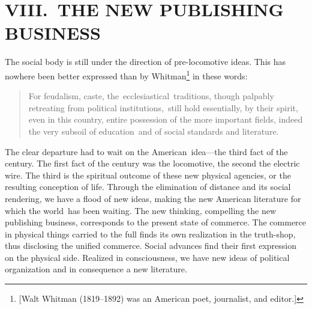 \documentclass[twoside,symmetric,nobib,justified]{tufte-book}
\begin{document}
\hypertarget{viii-the-new-publishing-business}{%
\section{VIII.~THE NEW PUBLISHING
BUSINESS~}\label{viii-the-new-publishing-business}}

The social body is still under the direction of pre-locomotive ideas.
This has nowhere been better expressed than by Whitman\footnote{{[}Walt
  Whitman (1819--1892) was an American poet, journalist, and editor.{]}}
in these words:

\begin{quote}
For feudalism, caste, the~ecclesiastical~traditions, though palpably
retreating from political institutions,~still hold essentially, by their
spirit, even in this country, entire possession of the more important
fields, indeed the very subsoil of education~and of social standards and
literature.
\end{quote}

\noindent The clear departure had to wait on the American~idea---the third fact of
the century. The first fact of the century was the locomotive, the
second the electric wire. The third is the spiritual outcome of these
new physical agencies, or the resulting conception of life. Through the
elimination of distance and its social rendering, we have a flood of new
ideas, making the new American literature for which the world~has been
waiting. The new thinking, compelling the new publishing business,
corresponds to the present state of commerce. The commerce in physical
things carried to the full finds its own realization in the truth-shop,
thus disclosing the unified commerce. Social advances find their first
expression on the physical side. Realized in consciousness, we have new
ideas of political organization and in consequence a new literature.~
\end{document}
